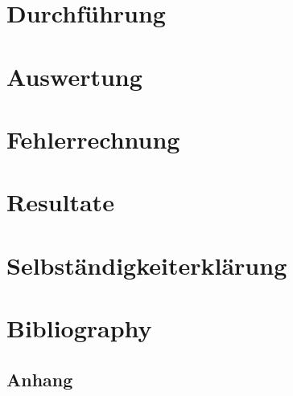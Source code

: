 \documentclass[10pt,a4paper,oneside]{article}
\begin{document}
\section{Durchführung}\label{sec:durchführung}

\clearpage

\section{Auswertung}\label{sec:auswertung}

\clearpage

\section{Fehlerrechnung}\label{sec:fehlerrechnung}

\clearpage

\section{Resultate}\label{sec:resultate}

\clearpage

\section{Selbständigkeiterklärung}\label{sec:selbstaendigkeiterklaerung}

\clearpage

\section{Bibliography}\label{sec:bibliography}

\clearpage

\begin{appendix}
\section{Anhang}\label{sec:appendix}

\end{appendix}
\end{document}
